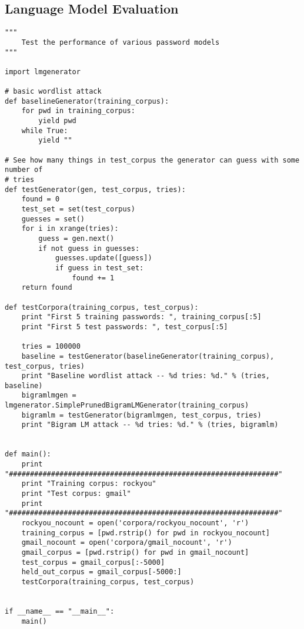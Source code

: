 \documentclass{amsart}
\theoremstyle{definition}
\theoremstyle{remark}
\numberwithin{equation}{section}
\begin{document}
\subsection{Language Model Evaluation}
\begin{lstlisting}
"""
    Test the performance of various password models
"""

import lmgenerator

# basic wordlist attack
def baselineGenerator(training_corpus):
    for pwd in training_corpus:
        yield pwd
    while True:
        yield ""

# See how many things in test_corpus the generator can guess with some number of
# tries
def testGenerator(gen, test_corpus, tries):
    found = 0
    test_set = set(test_corpus)
    guesses = set()
    for i in xrange(tries):
        guess = gen.next()
        if not guess in guesses:
            guesses.update([guess])
            if guess in test_set:
                found += 1
    return found

def testCorpora(training_corpus, test_corpus):
    print "First 5 training passwords: ", training_corpus[:5]
    print "First 5 test passwords: ", test_corpus[:5]

    tries = 100000
    baseline = testGenerator(baselineGenerator(training_corpus), test_corpus, tries)
    print "Baseline wordlist attack -- %d tries: %d." % (tries, baseline)
    bigramlmgen = lmgenerator.SimplePrunedBigramLMGenerator(training_corpus)
    bigramlm = testGenerator(bigramlmgen, test_corpus, tries)
    print "Bigram LM attack -- %d tries: %d." % (tries, bigramlm)
 

def main():
    print "################################################################"
    print "Training corpus: rockyou"
    print "Test corpus: gmail"
    print "################################################################"
    rockyou_nocount = open('corpora/rockyou_nocount', 'r')
    training_corpus = [pwd.rstrip() for pwd in rockyou_nocount]
    gmail_nocount = open('corpora/gmail_nocount', 'r')
    gmail_corpus = [pwd.rstrip() for pwd in gmail_nocount]
    test_corpus = gmail_corpus[:-5000]
    held_out_corpus = gmail_corpus[-5000:]
    testCorpora(training_corpus, test_corpus)


if __name__ == "__main__":
    main()
\end{lstlisting}
\end{document}

